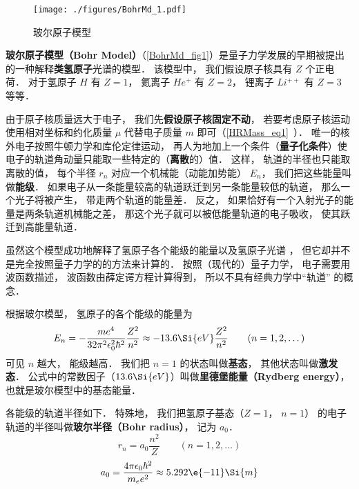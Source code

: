 

\begin{figure}[ht]
\centering
\texttt{[image: ./figures/BohrMd\_1.pdf]}
\caption{玻尔原子模型} \label{BohrMd_fig1}
\end{figure}

\textbf{玻尔原子模型（Bohr Model）}（\autoref{BohrMd_fig1}）是量子力学发展的早期被提出的一种解释\textbf{类氢原子}光谱的模型． 该模型中， 我们假设原子核具有 $Z$ 个正电荷． 对于氢原子 $H$ 有 $Z = 1$， 氦离子 $He^+$ 有 $Z = 2$， 锂离子 $Li^{++}$ 有 $Z = 3$ 等等．

由于原子核质量远大于电子， 我们先\textbf{假设原子核固定不动}， 若要考虑原子核运动使用相对坐标和约化质量 $\mu$ 代替电子质量 $m$ 即可（\autoref{HRMass_eq1}~）．
唯一的核外电子按照牛顿力学和库伦定律运动， 再人为地加上一个条件（\textbf{量子化条件}）使电子的轨道角动量只能取一些特定的（\textbf{离散}的）值． 这样， 轨道的半径也只能取离散的值， 每个半径 $r_n$ 对应一个机械能（动能加势能） $E_n$， 我们把这些能量叫做\textbf{能级}． 如果电子从一条能量较高的轨道跃迁到另一条能量较低的轨道， 那么一个光子将被产生， 带走两个轨道的能量差． 反之， 如果恰好有一个入射光子的能量是两条轨道机械能之差， 那这个光子就可以被低能量轨道的电子吸收， 使其跃迁到高能量轨道．

虽然这个模型成功地解释了氢原子各个能级的能量以及氢原子光谱%
， 但它却并不是完全按照量子力学的的方法来计算的． 按照（现代的）量子力学， 电子需要用波函数描述， 波函数由薛定谔方程计算得到， 所以不具有经典力学中“轨道” 的概念．

根据玻尔模型， 氢原子的各个能级的能量为
\begin{equation}
E_n =  - \frac{m e^4}{32 \pi^2 \epsilon_0^2 \hbar ^2} \frac{Z^2}{n^2} \approx - 13.6\Si{eV} \frac{Z^2}{n^2}
\qquad (n = 1, 2, \dots)
\end{equation}
可见 $n$ 越大， 能级越高． 我们把 $n = 1$ 的状态叫做\textbf{基态}， 其他状态叫做\textbf{激发态}． 公式中的常数因子（$13.6\Si{eV}$）叫做\textbf{里德堡能量（Rydberg energy）}， 也就是玻尔模型中的基态能量．

各能级的轨道半径如下． 特殊地， 我们把氢原子基态（$Z = 1$， $n = 1$） 的电子轨道的半径叫做\textbf{玻尔半径（Bohr radius）}， 记为 $a_0$．
\begin{equation}\label{BohrMd_eq1}
r_n = a_0 \frac{n^2}{Z}
\qquad (n = 1, 2, \dots)
\end{equation}
\begin{equation}\label{BohrMd_eq3}
a_0 = \frac{4\pi \epsilon_0 \hbar^2}{m_e e^2} \approx 5.292\e{-11}\Si{m}
\end{equation}


